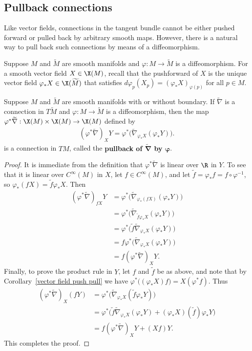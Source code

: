 \subsection{Pullback connections}
Like vector fields, connections in the tangent bundle cannot be either pushed forward or pulled back by arbitrary smooth maps. However, there is a natural way to 
pull back such connections by means of a diffeomorphism.\par
Suppose $M$ and $\widetilde{M}$ are smooth manifolds and $\varphi:M\to\widetilde{M}$ is a diffeomorphism. For a smooth vector field $X\in\X(M)$, recall that the 
pushforward of $X$ is the unique vector field $\varphi_*X\in\X(\widetilde{M})$ that satisfies $d\varphi_p(X_p)=(\varphi_*X)_{\varphi(p)}$ for all $p\in M$.
\begin{lemma}\label{connection pull back}
Suppose $M$ and $\widetilde{M}$ are smooth manifolds with or without boundary. If $\widetilde{\nabla}$ is a connection in $T\widetilde{M}$ and $\varphi:M\to\widetilde{M}$ 
is a diffeomorphism, then the map $\varphi^*\widetilde{\nabla}:\X(M)\times\X(M)\to\X(M)$ defined by
\begin{align}\label{connection pull back-1}
(\varphi^*\widetilde{\nabla})_XY=\varphi^*\big(\widetilde{\nabla}_{\varphi_*X}(\varphi_*Y)\big).
\end{align}
is a connection in $TM$, called the \textbf{pullback of $\bm{\widetilde{\nabla}}$ by $\bm{\varphi}$}.
\end{lemma}
\begin{proof}
It is immediate from the definition that $\varphi^*\widetilde{\nabla}$ is linear over $\R$ in $Y$. To see that it is linear over $C^\infty(M)$ in $X$, let $f\in C^\infty(M)$, 
and let $\widetilde{f}=\varphi_*f=f\circ\varphi^{-1}$, so $\varphi_*(fX)=\widetilde{f}\varphi_*X$. Then
\begin{align*}
(\varphi^*\widetilde{\nabla})_{fX}Y&=\varphi^*\big(\widetilde{\nabla}_{\varphi_*(fX)}(\varphi_*Y)\big)\\
&=\varphi^*\big(\widetilde{\nabla}_{\widetilde{f}\varphi_*X}(\varphi_*Y)\big)\\
&=\varphi^*\big(\widetilde{f}\widetilde{\nabla}_{\varphi_*X}(\varphi_*Y)\big)\\
&=f\varphi^*\big(\widetilde{\nabla}_{\varphi_*X}(\varphi_*Y)\big)\\
&=f(\varphi^*\widetilde{\nabla})_{X}Y.
\end{align*}
Finally, to prove the product rule in $Y$, let $f$ and $\widetilde{f}$ be as above, and note that by Corollary~\ref{vector field push pull} we have 
$\varphi^*\big((\varphi_*X)f\big)=X(\varphi^*f)$. Thus
\begin{align*}
(\varphi^*\widetilde{\nabla})_X(fY)&=\varphi^*\big(\widetilde{\nabla}_{\varphi_*X}(\widetilde{f}\varphi_*Y)\big)\\
&=\varphi^*\big(\widetilde{f}\widetilde{\nabla}_{\varphi_*X}(\varphi_*Y)+(\varphi_*X)(\widetilde{f})\varphi_*Y\big)\\
&=f(\varphi^*\widetilde{\nabla})_XY+(Xf)Y.
\end{align*}
This completes the proof.
\end{proof}

